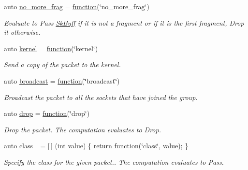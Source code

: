 \begin{DoxyCompactItemize}
auto \hyperlink{namespacepfq_1_1lang_1_1anonymous__namespace_02default_8hpp_03_a88628ce70e2a650af1338851373b9891}{no\+\_\+more\+\_\+frag} = \hyperlink{namespacepfq_1_1lang_a1a4638059d700ae08d0ca63886ff2bb3}{function}(\char`\"{}no\+\_\+more\+\_\+frag\char`\"{})
\begin{DoxyCompactList}\small\item\em Evaluate to {\ttfamily Pass} \hyperlink{structpfq_1_1lang_1_1SkBuff}{Sk\+Buff} if it is not a fragment or if it is the first fragment, {\ttfamily Drop} it otherwise. \end{DoxyCompactList}\item 
auto \hyperlink{namespacepfq_1_1lang_1_1anonymous__namespace_02default_8hpp_03_a93294225145f96c6aa6cf0cedfa19103}{kernel} = \hyperlink{namespacepfq_1_1lang_a1a4638059d700ae08d0ca63886ff2bb3}{function}(\char`\"{}kernel\char`\"{})
\begin{DoxyCompactList}\small\item\em Send a copy of the packet to the kernel. \end{DoxyCompactList}\item 
auto \hyperlink{namespacepfq_1_1lang_1_1anonymous__namespace_02default_8hpp_03_ac9e0f3ad7fa32146565f4aaab709d19d}{broadcast} = \hyperlink{namespacepfq_1_1lang_a1a4638059d700ae08d0ca63886ff2bb3}{function}(\char`\"{}broadcast\char`\"{})
\begin{DoxyCompactList}\small\item\em Broadcast the packet to all the sockets that have joined the group. \end{DoxyCompactList}\item 
auto \hyperlink{namespacepfq_1_1lang_1_1anonymous__namespace_02default_8hpp_03_a0d715988e000ac6284a1615091eb4067}{drop} = \hyperlink{namespacepfq_1_1lang_a1a4638059d700ae08d0ca63886ff2bb3}{function}(\char`\"{}drop\char`\"{})
\begin{DoxyCompactList}\small\item\em Drop the packet. The computation evaluates to {\ttfamily Drop}. \end{DoxyCompactList}\item 
auto \hyperlink{namespacepfq_1_1lang_1_1anonymous__namespace_02default_8hpp_03_a73e1198ca0a5077b083d7900cff17505}{class\+\_\+} = \mbox{[}$\,$\mbox{]} (int value) \{ return \hyperlink{namespacepfq_1_1lang_a1a4638059d700ae08d0ca63886ff2bb3}{function}(\char`\"{}class\char`\"{}, value); \}
\begin{DoxyCompactList}\small\item\em Specify the class for the given packet.. The computation evaluates to {\ttfamily Pass}. \end{DoxyCompactList}\item 

\end{DoxyCompactItemize}
